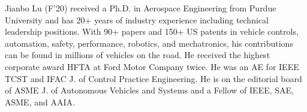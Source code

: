 \documentclass[journal]{IEEEtran}
\begin{document}
\begin{IEEEbiography}{Jianbo Lu} (F'20) received a Ph.D. in Aerospace Engineering from Purdue University and has 20+ years of industry experience including technical leadership positions. With 90+ papers and 150+ US patents in vehicle controls, automation, safety, performance, robotics, and mechatronics, his contributions can be found in millions of vehicles on the road. He received the highest corporate award HFTA at Ford Motor Company twice. He was an AE for IEEE TCST and IFAC J. of Control Practice Engineering. He is on the editorial board of ASME J. of Autonomous Vehicles and Systems and a Fellow of IEEE, SAE, ASME, and AAIA.
\end{IEEEbiography}










\end{document}
